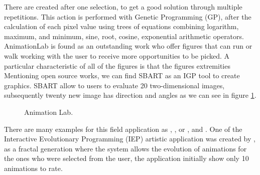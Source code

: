 There are created after one selection, to get a good solution through multiple
repetitions. This action is performed with Genetic Programming (GP), after the
calculation of each pixel value using trees of equations combining logarithm,
maximum, and minimum, sine, root, cosine, exponential arithmetic operators.
AnimationLab is found as an outstanding work who offer figures that can run or
walk working with the user to receive more opportunities to be picked. A
particular characteristic of all of the figures is that the figures extremities
Mentioning open source works, we can find SBART as an IGP
\cite{unemi2000sbart} tool to create graphics. SBART allow to users
to evaluate 20 two-dimensional images, subsequently twenty new image has
direction and angles as we can see in figure \ref{fig:AnimationLab}.

\begin{figure}
\captionsetup{justification=centering,margin=2cm}
\centering
\setlength\fboxsep{0pt}
\setlength\fboxrule{0.7pt}
\caption{Animation Lab.}
\label{fig:AnimationLab}
\end{figure}

There are many examples for this field application as
\cite{mckenna1990dynamic},
\cite{ventrella1994explorations}, or
\cite{ventrella1995disney}, \cite{lim1999pro} and
\cite{lim2000solve}.  One of the Interactive Evolutionary Programming
(IEP)  artistic application was created by \cite{angeline1996evolving}, as a fractal generation where the system allows the evolution of
animations for the ones who were selected from the user, the application
initially show only 10 animations to rate.


